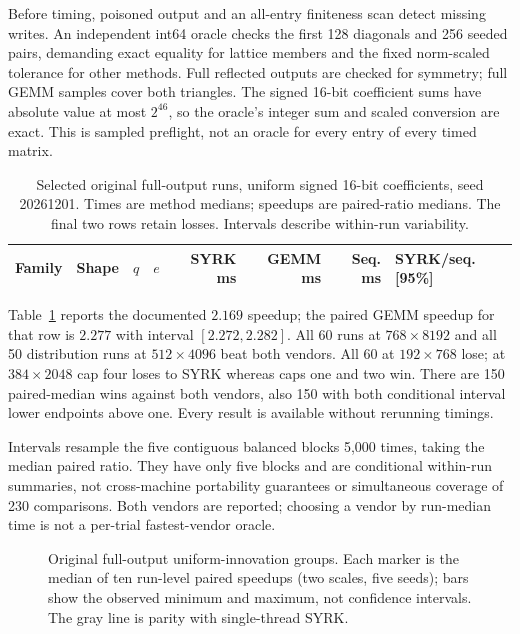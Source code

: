 \documentclass[10pt,a4paper]{article}
\begin{document}
Before timing, poisoned output and an all-entry finiteness scan detect missing
writes. An independent int64 oracle checks the first 128 diagonals and 256
seeded pairs, demanding exact equality for lattice members and the fixed
norm-scaled tolerance for other methods. Full reflected outputs are checked
for symmetry; full GEMM samples cover both triangles. The signed 16-bit
coefficient sums have absolute value at most $2^{46}$, so the oracle's integer
sum and scaled conversion are exact. This is sampled preflight, not an oracle
for every entry of every timed matrix.

\begin{table}[t]
\centering\scriptsize
\setlength{\tabcolsep}{3pt}
\begin{tabular}{llrr rrr l}
\toprule
Family & Shape & $q$ & $e$ & SYRK ms & GEMM ms & Seq. ms & SYRK/seq. [95\%]\\
\midrule

\end{tabular}
\caption{Selected original full-output runs, uniform signed 16-bit coefficients,
seed 20261201. Times are method medians; speedups are paired-ratio medians.
The final two rows retain losses. Intervals describe within-run variability.}
\label{tab:original}
\end{table}

Table~\ref{tab:original} reports the documented $2.169$ speedup; the paired
GEMM speedup for that row is $2.277$ with interval $[2.272,2.282]$. All 60
runs at $768\times8192$ and all 50 distribution runs at $512\times4096$
beat both vendors. All 60 at $192\times768$ lose; at $384\times2048$ cap
four loses to SYRK whereas caps one and two win. There are 150 paired-median
wins against both vendors, also 150 with both conditional interval lower
endpoints above one. Every result is available without rerunning timings.

Intervals resample the five contiguous balanced blocks 5,000 times, taking
the median paired ratio. They have only five blocks and are conditional
within-run summaries, not cross-machine portability guarantees or simultaneous
coverage of 230 comparisons. Both vendors are reported; choosing a vendor by
run-median time is not a per-trial fastest-vendor oracle.

\begin{figure}[t]
\centering
\resizebox{\linewidth}{!}{}
\caption{Original full-output uniform-innovation groups. Each marker is the
median of ten run-level paired speedups (two scales, five seeds); bars show
the observed minimum and maximum, not confidence intervals. The gray line
is parity with single-thread SYRK.}
\label{fig:boundary}
\end{figure}
\end{document}
